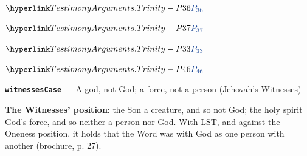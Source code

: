 \documentclass[11pt,paper=\testimonypaper,DIV=13,parskip=false]{scrartcl}
\begin{document}
\begin{derivation}
  \item[(1)] \(\pvar{TestimonyArguments.Trinity}{36}\)
  \item[(2)] \(\pvar{TestimonyArguments.Trinity}{37}\)
  \item[(3)] \(\pvar{TestimonyArguments.Trinity}{33}\)
  \item[(4)] \(\pvar{TestimonyArguments.Trinity}{46}\)
\end{derivation}
\par\medskip\noindent\textbf{\texttt{witnesses\allowbreak{}Case}} --- A god, not God; a force, not a person (Jehovah’s Witnesses)\par\nobreak\noindent
\textbf{The Witnesses’ position}: the Son a creature, and so not God; the holy spirit God’s force, and so neither a person nor God. With LST, and against the Oneness position, it holds that the Word was with God as one person with another (brochure, p. 27).
\end{document}
